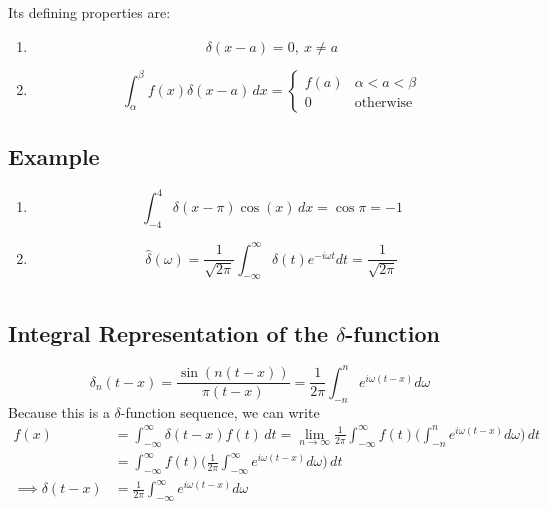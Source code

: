 \documentclass[a4paper, 11pt, normalem]{report}
\newcommand\ifnt{\int_{-\infty}^{\infty}}
\newcommand\om{\omega}
\begin{document}
Its defining properties are:
\begin{enumerate}
    \item   \begin{equation*}
                \delta(x - a) = 0,~ x \neq a
            \end{equation*}
    \item   \begin{equation*}
                \int_{\alpha}^{\beta} f(x)\delta(x - a)\,dx =
                \begin{cases}
                    f(a) & \alpha < a < \beta \\
                    0 & \text{otherwise}
                \end{cases}
            \end{equation*}
\end{enumerate}

\section{Example}
\begin{enumerate}
    \item   \begin{equation*}
                \int_{-4}^{4} \delta(x - \pi)\cos(x)\,dx = \cos\pi = -1
            \end{equation*}
    \item   \begin{equation*}
                \hat{\delta}(\om) = \frac{1}{\sqrt{2\pi}} \ifnt \delta(t)e^{-i\om t}dt = \frac{1}{\sqrt{2\pi}}
            \end{equation*}
\end{enumerate}

\chapter{}
\section{Integral Representation of the $\delta$-function}
\begin{equation*}
    \delta_n (t - x) = \frac{\sin(n(t - x))}{\pi(t - x)} = \frac{1}{2\pi} \int_{-n}^{n} e^{i\om(t - x)}d\om
\end{equation*}
Because this is a $\delta$-function sequence, we can write
\begin{align*}
    f(x) &= \ifnt \delta(t - x)f(t)\,dt = \lim_{n \to \infty} \frac{1}{2\pi} \ifnt f(t) \Bigg(\int_{-n}^{n} e^{i\om(t - x)}d\om\Bigg)\,dt \\
    &= \ifnt f(t)\Bigg(\frac{1}{2\pi} \ifnt e^{i\om(t - x)} d\om\Bigg)\,dt \\
    \implies \delta(t - x) &= \frac{1}{2\pi} \ifnt e^{i\om(t - x)} d\om
\end{align*}
\end{document}
